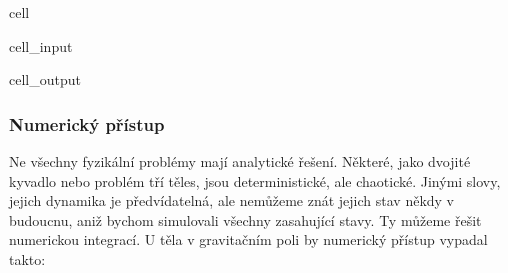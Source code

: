 \documentclass[letterpaper,10pt,english]{jupyterBook}
\begin{document}
\begin{sphinxuseclass}{cell}
\begin{sphinxVerbatimInput}
\begin{sphinxuseclass}{cell_input}
\end{sphinxuseclass}\end{sphinxVerbatimInput}
\begin{sphinxVerbatimOutput}

\begin{sphinxuseclass}{cell_output}
\noindent{}

\end{sphinxuseclass}\end{sphinxVerbatimOutput}

\end{sphinxuseclass}

\subsubsection{Numerický přístup}
\label{\detokenize{Prednasky/1_5_Lagrange_Eulerovy_rovnice:numericky-pristup}}
\sphinxAtStartPar
Ne všechny fyzikální problémy mají analytické řešení. Některé, jako dvojité kyvadlo nebo problém tří těles, jsou deterministické, ale chaotické. Jinými slovy, jejich dynamika je předvídatelná, ale nemůžeme znát jejich stav někdy v budoucnu, aniž bychom simulovali všechny zasahující stavy. Ty můžeme řešit numerickou integrací. U těla v gravitačním poli by numerický přístup vypadal takto:
\end{document}

